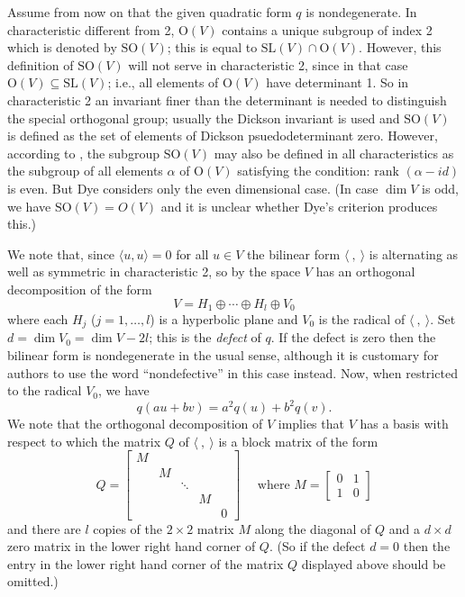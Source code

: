 \documentclass[12pt,oneside]{amsart}
\theoremstyle{definition}
\theoremstyle{remark}
\newcommand{\SL}{\mathrm{SL}}
\renewcommand{\O}{\mathrm{O}}
\newcommand{\SO}{\mathrm{SO}}
\newcommand{\inner}[2]{\langle #1, #2 \rangle}
\begin{document}
Assume from now on that the given quadratic form $q$ is
nondegenerate. In characteristic different from 2, $\O(V)$ contains a
unique subgroup of index 2 which is denoted by $\SO(V)$; this is equal
to $\SL(V) \cap \O(V)$. However, this definition of $\SO(V)$ will not
serve in characteristic 2, since in that case $\O(V) \subseteq
\SL(V)$; i.e., all elements of $\O(V)$ have determinant 1. So in
characteristic 2 an invariant finer than the determinant is needed to
distinguish the special orthogonal group; usually the Dickson
invariant is used and $\SO(V)$ is defined as the set of elements of
Dickson psuedodeterminant zero. However, according to \cite{Dye}, the
subgroup $\SO(V)$ may also be defined in all characteristics as the
subgroup of all elements $\alpha$ of $\O(V)$ satisfying the condition:
$\text{rank }(\alpha - id)$ is even. But Dye considers only the
even dimensional case. (In case $\dim V$ is odd, we have $\SO(V) =
O(V)$ and it is unclear whether Dye's criterion produces this.)



We note that, since $\inner{u}{u}=0$ for all $u \in V$ the bilinear
form $\inner{\ }{\ }$ is alternating as well as symmetric in
characteristic 2, so by \cite[Theorem 2.10]{Grove} the space $V$ has
an orthogonal decomposition of the form
\[
  V = H_1 \oplus \cdots \oplus H_l \oplus V_0
\]
where each $H_j$ ($j = 1, \dots, l$) is a hyperbolic plane and $V_0$
is the radical of $\inner{\ }{\ }$.  Set $d = \dim V_0 = \dim V - 2l$;
this is the \emph{defect} of $q$. If the defect is zero then the
bilinear form is nondegenerate in the usual sense, although it is
customary for authors to use the word ``nondefective'' in this case
instead.  Now, when restricted to the radical $V_0$, we have 
\[
  q(au + bv) = a^2 q(u) + b^2 q(v) .
\]
We note that the orthogonal decomposition of $V$ implies that $V$ has
a basis with respect to which the matrix $Q$ of $\inner{\ }{\ }$ is a
block matrix of the form
\[
  Q = 
  \begin{bmatrix}
    M \\
    & M \\
    & & \ddots \\
    & & & M \\
    & & & & 0
  \end{bmatrix}
\quad \text{ where } M = 
\begin{bmatrix}
  0&1\\
  1&0
\end{bmatrix}
\]
and there are $l$ copies of the $2 \times 2$ matrix $M$ along the
diagonal of $Q$ and a $d \times d$ zero matrix in the lower right hand
corner of $Q$. (So if the defect $d = 0$ then the entry in the lower
right hand corner of the matrix $Q$ displayed above should be
omitted.)
\end{document}
